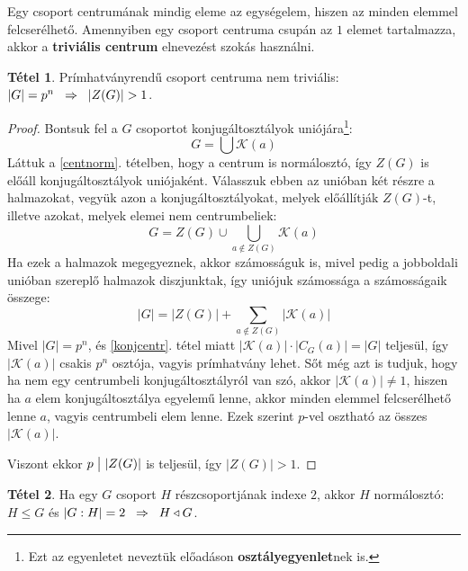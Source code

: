 \documentclass[12pt]{book}
\theoremstyle{plain} %
\theoremstyle{definition} %
\newtheorem{theo/}{Tétel}[section]
\newenvironment{theo}
  {\renewcommand{\qedsymbol}{$\clubsuit$}%
   \pushQED{\qed}\begin{theo/}}
  {\popQED\end{theo/}}
\theoremstyle{remark}
\renewcommand\qedsymbol{$\blacksquare$}
\numberwithin{equation}{section}  %
\begin{document}
	Egy csoport centrumának mindig eleme az egységelem, hiszen az minden elemmel felcserélhető. Amennyiben egy csoport centruma csupán az $1$ elemet tartalmazza, akkor a \textbf{triviális centrum} elnevezést szokás használni.
	
	\begin{theo}\label{prcentr}
		Prímhatványrendű csoport centruma nem triviális: $|G|=p^n \hspace{2mm} \Rightarrow \hspace{2mm} |Z(G)| > 1$.
	\end{theo}

	\begin{proof}
		Bontsuk fel a $G$ csoportot konjugáltosztályok uniójára\footnote{Ezt az egyenletet neveztük előadáson \textbf{osztályegyenlet}nek is.}:
		\[ G = \bigcup \mathcal{K}(a)  \]
		Láttuk a \ref{centnorm}. tételben, hogy a centrum is normálosztó, így $Z(G)$ is előáll konjugáltosztályok uniójaként. Válasszuk ebben az unióban két részre a halmazokat, vegyük azon a konjugáltosztályokat, melyek előállítják $Z(G)$-t, illetve azokat, melyek elemei nem centrumbeliek:
		\[ G = Z(G) \cup  \bigcup_{a\notin Z(G)} \mathcal{K}(a)  \]
		Ha ezek a halmazok megegyeznek, akkor számosságuk is, mivel pedig a jobboldali unióban szereplő halmazok diszjunktak, így uniójuk számossága a számosságaik összege:
		\[ |G| = |Z(G)| + \sum_{a \notin Z(G)} |\mathcal{K}(a)|  \]
		Mivel $|G|=p^n$, és \ref{konjcentr}. tétel miatt $|\mathcal{K}(a)|\cdot |C_G(a)| = |G|$ teljesül, így $|\mathcal{K}(a)|$ csakis $p^n$ osztója, vagyis prímhatvány lehet. Sőt még azt is tudjuk, hogy ha nem egy centrumbeli konjugáltosztályról van szó, akkor $|\mathcal{K}(a)|\neq 1$, hiszen ha $a$ elem konjugáltosztálya egyelemű lenne, akkor minden elemmel felcserélhető lenne $a$, vagyis centrumbeli elem lenne. Ezek szerint $p$-vel osztható az összes $|\mathcal{K}(a)|$.
		
		Viszont ekkor $p \bigm| |Z(G)|$ is teljesül, így $|Z(G)| > 1$.
	\end{proof}
	
	\begin{theo}\label{indexnorm}
		Ha egy $G$ csoport $H$ részcsoportjának indexe $2$, akkor $H$ normálosztó: $H\leq G$ és $|G:H|=2 \hspace{2mm} \Rightarrow \hspace{2mm} H\triangleleft G$.
	\end{theo}
	
\end{document}
